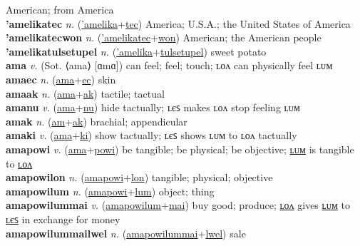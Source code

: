 American; from America \label{'amelikaak} \\
\textbf{'amelikatec} \textit{n.} (\hyperref['amelika]{'amelika}+\hyperref[tec]{tec})
America; U.S.A.; the United States of America \label{'amelikatec} \\
\textbf{'amelikatecwon} \textit{n.} (\hyperref['amelikatec]{'amelikatec}+\hyperref[won]{won})
American; the American people \label{'amelikatecwon} \\
\textbf{'amelikatulsetupel} \textit{n.} (\hyperref['amelika]{'amelika}+\hyperref[tulsetupel]{tulsetupel})
sweet potato \label{'amelikatulsetupel} \\
\textbf{ama} \textit{v.} (Sot. ⟨ama⟩ [ɑmɑ])
can feel; feel; touch; ʟᴏᴧ can physically feel ʟᴜᴍ \label{ama} \\
\textbf{amaec} \textit{n.} (\hyperref[ama]{ama}+\hyperref[ec]{ec})
skin \label{amaec} \\
\textbf{amaak} \textit{n.} (\hyperref[ama]{ama}+\hyperref[ak]{ak})
tactile; tactual \label{amaak} \\
\textbf{amanu} \textit{v.} (\hyperref[ama]{ama}+\hyperref[nu]{nu})
hide tactually; ʟєꜱ makes ʟᴏᴧ stop feeling ʟᴜᴍ \label{amanu} \\
\textbf{amak} \textit{n.} (\hyperref[am]{am}+\hyperref[ak]{ak})
brachial; appendicular \label{amak} \\
\textbf{amaki} \textit{v.} (\hyperref[ama]{ama}+\hyperref[ki]{ki})
show tactually; ʟєꜱ shows ʟᴜᴍ to ʟᴏᴧ tactually \label{amaki} \\
\textbf{amapowi} \textit{v.} (\hyperref[ama]{ama}+\hyperref[powi]{powi})
be tangible; be physical; be objective; \hyperref[amapowilum]{ʟᴜᴍ} is tangible to \hyperref[amapowilon]{ʟᴏᴧ} \label{amapowi} \\
\textbf{amapowilon} \textit{n.} (\hyperref[amapowi]{amapowi}+\hyperref[lon]{lon})
tangible; physical; objective \label{amapowilon} \\
\textbf{amapowilum} \textit{n.} (\hyperref[amapowi]{amapowi}+\hyperref[lum]{lum})
object; thing \label{amapowilum} \\
\textbf{amapowilummai} \textit{v.} (\hyperref[amapowilum]{amapowilum}+\hyperref[mai]{mai})
buy good; produce; \hyperref[amapowilummailon]{ʟᴏᴧ} gives \hyperref[amapowilummailum]{ʟᴜᴍ} to \hyperref[amapowilummailes]{ʟєꜱ} in exchange for money \label{amapowilummai} \\
\textbf{amapowilummailwel} \textit{n.} (\hyperref[amapowilummai]{amapowilummai}+\hyperref[lwel]{lwel})
sale \label{amapowilummailwel} \\
